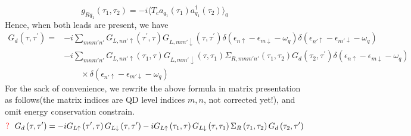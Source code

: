 \documentclass[11pt,a4paper]{article}
\begin{document}
\begin{equation}
g_{Rq_{1}}(\tau_{1}, \tau_{2}) = -i\langle T_{c}a_{q_{1}}(\tau_{1}) a_{q_{1}}^{\dag}(\tau_{2})\rangle_{0}
\end{equation}
Hence, when both leads are present, we have
\begin{equation}
\begin{split}
G_{d}\left(\tau, \tau^{\prime}\right)=&-i \sum_{mnm'n'}G_{L,nn' \uparrow}\left(\tau^{\prime}, \tau\right) G_{L,mm' \downarrow}\left(\tau, \tau^{\prime}\right)\delta\left(\epsilon_{n \uparrow}-\epsilon_{m \downarrow}-\omega_{q}\right) \delta\left(\epsilon_{n' \uparrow}-\epsilon_{m' \downarrow}-\omega_{q}\right)\\
&-i \sum_{mnm'n'}G_{L,nn' \uparrow}\left(\tau_{1}, \tau\right) G_{L,mm' \downarrow}\left(\tau, \tau_{1}\right) \Sigma_{R,mnm'n'}\left(\tau_{1}, \tau_{2}\right) G_{d}\left(\tau_{2}, \tau^{\prime}\right) \delta\left(\epsilon_{n \uparrow}-\epsilon_{m \downarrow}-\omega_{q}\right)\\
&\qquad\times \delta\left(\epsilon_{n' \uparrow}-\epsilon_{m' \downarrow}-\omega_{q}\right)
\label{eq:1}
\end{split}
\end{equation}
For the sack of convenience, we rewrite the above formula in matrix presentation as follows(the matrix indices are QD level indices $m,n$, not corrected yet!), and omit energy conservation constrain.
\begin{equation}
{\color{red}{?}}~~G_{d}\left(\tau, \tau^{\prime}\right)=-i G_{L \uparrow}\left(\tau^{\prime}, \tau\right) G_{L \downarrow}\left(\tau, \tau^{\prime}\right)-i G_{L \uparrow}\left(\tau_{1}, \tau\right) G_{L \downarrow}\left(\tau, \tau_{1}\right) \Sigma_{R }\left(\tau_{1}, \tau_{2}\right) G_{d}\left(\tau_{2}, \tau^{\prime}\right)
\end{equation}
\end{document}
